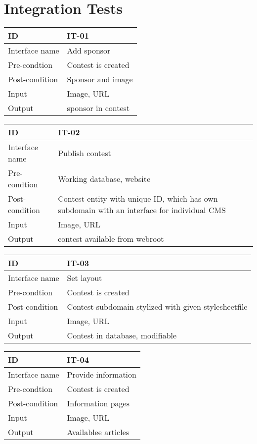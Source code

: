\chapter{Integration Tests}\label{appendix:integrationTest}


\begin{longtable}{|l|p{}|}
\hline
ID & IT-01\\\hline
Interface name & Add sponsor\\\hline
Pre-condtion & Contest is created\\\hline
Post-condition & Sponsor and image\\\hline
Input & Image, URL\\\hline
Output & sponsor in contest\\\hline
\end{longtable}


\begin{longtable}{|l|p{}|}
\hline
ID & IT-02\\\hline
Interface name & Publish contest\\\hline
Pre-condtion & Working database, website\\\hline
Post-condition & Contest entity with unique ID, which has own subdomain with an
    interface for
individual CMS\\\hline Input &
Image, URL\\\hline Output &
contest available from webroot\\\hline
\end{longtable}


\begin{longtable}{|l|p{}|}
\hline
ID & IT-03\\\hline
Interface name & Set layout\\\hline
Pre-condtion & Contest is created\\\hline
Post-condition & Contest-subdomain stylized with given stylesheetfile\\\hline
Input & Image, URL\\\hline
Output & Contest in database, modifiable\\\hline
\end{longtable}


\pagebreak
\begin{longtable}{|l|p{}|}
\hline
ID & IT-04\\\hline
Interface name & Provide information\\\hline
Pre-condtion & Contest is created\\\hline
Post-condition & Information pages\\\hline
Input & Image, URL\\\hline
Output & Availablee articles\\\hline
\end{longtable}


